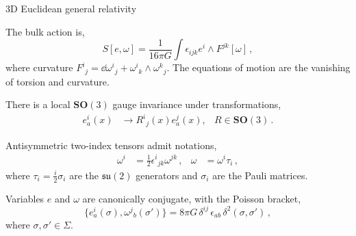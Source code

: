 \documentclass[12pt,titlepage]{article}
\begin{document}
\begin{frame}{3D Euclidean general relativity}
    \begin{list}{\,}{\leftmargin=1em \itemindent=0em}
        \item<1-> The bulk action is,
        \begin{equation}
            S[e,\omega]=\frac{1}{16\pi G}\int \epsilon_{ijk}e^i \wedge F^{jk}[\omega]\,,
        \end{equation}
        where curvature ${F^i}_j=\dd{{\omega^i}_j}+{\omega^i}_k \wedge {\omega^k}_j$. The equations of motion are the vanishing of torsion and curvature.
        \item<2-> There is a local $\mathbf{SO}(3)$ gauge invariance under transformations,
        \begin{align}
            e^i_a(x)&\to {R^i}_j(x)e^j_a(x), &R\in\mathbf{SO}(3)\,.
        \end{align}
        \item<3-> Antisymmetric two-index tensors admit notations,
        \begin{align}
            \omega^i&=\frac{1}{2}{\epsilon^i}_{jk}\omega^{jk}\,, &\omega&=\omega^i\tau_i\,, 
        \end{align}
        where $\tau_i=\frac{i}{2}\sigma_i$ are the $\mathfrak{su}(2)$ generators and $\sigma_i$ are the Pauli matrices.
        \item<4-> Variables $e$ and $\omega$ are canonically conjugate, with the Poisson bracket,
        \begin{equation}
            \{e^i_a(\sigma),{\omega^j}_b(\sigma')\}=8\pi G\,\delta^{ij}\,\epsilon_{ab}\, \delta^2(\sigma,\sigma')\,,
        \end{equation}
        where $\sigma,\sigma'\in\Sigma$.
    \end{list}
\end{frame}


\end{document}

